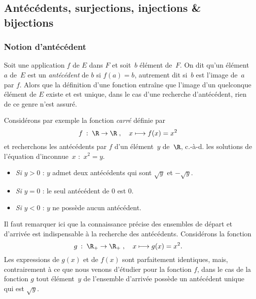 \subsection{Antécédents, surjections, injections \& bijections}
\subsubsection{Notion d'antécédent}
Soit une application $f$ de $E$ dans $F$ et soit~$b$ élément de~$F$. On dit qu'un élément~$a$ de~$E$ est un \emph{antécédent} de $b$ si $f(a)=b$, autrement dit si~$b$ est l'image de~$a$ par $f$.
Alors que la définition d'une fonction entraîne que l'image d'un quelconque élément de $E$ existe et est unique, dans le cas d'une recherche d'antécédent, rien de ce genre n'est assuré.

Considérons par exemple la fonction \emph{carré} définie par
\[f\::\;\R\to\R\;,\quad x\longmapsto f(x)=x^2 \]
et recherchons les antécédents par $f$ d'un élément~$y$ de~$\R$, c.-à-d. les solutions de l'équation d'inconnue~$x$ :~\mbox{$x^2=y$}.
\begin{itemize}
\item \textit{Si $y>0$} : $y$ admet deux antécédents qui sont $\sqrt{y}$ et $-\sqrt{y}$.
\item \textit{Si $y=0$} : le seul antécédent de $0$ est $0$.
\item \textit{Si $y<0$} : $y$ ne possède aucun antécédent.
\end{itemize}
\begin{remark}
Il faut remarquer ici que la connaissance précise des ensembles de départ et d'arrivée est indispensable à la recherche des antécédents. Considérons la fonction
\[g\::\;\R_+\to\R_+\;,\quad x\longmapsto g(x)=x^2. \]
Les expressions de $g(x)$ et de $f(x)$ sont parfaitement identiques, mais, contrairement à ce que nous venons d'étudier pour la fonction $f$,  dans le cas de la fonction $g$ tout élément~$y$ de l'ensemble d'arrivée possède un antécédent unique qui est $\sqrt{y}$.
\end{remark}
